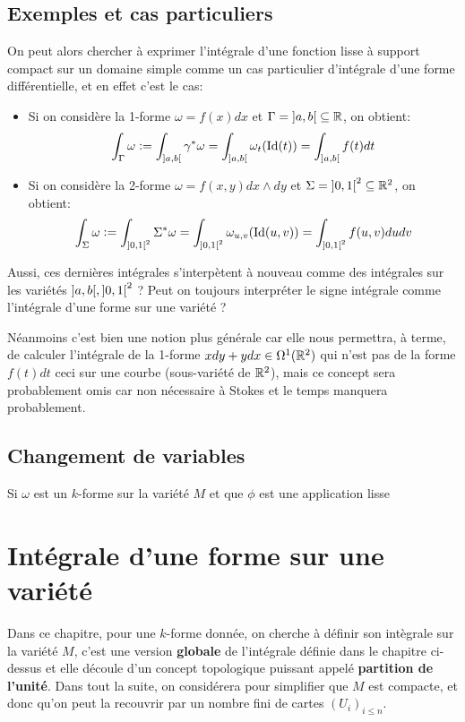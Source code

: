 \section{Exemples et cas particuliers}
On peut alors chercher à exprimer l'intégrale d'une fonction lisse à support compact sur un domaine simple comme un cas particulier d'intégrale d'une forme différentielle, et en effet c'est le cas:
\begin{itemize}
   \item Si on considère la 1-forme \( \omega = f(x)dx \) et \( \Gamma = \ioo{a}{b} \subseteq \R\), on obtient:
   \[ 
      \int_\Gamma \omega := \int_{\ioo{a}{b}}  \gamma^*\omega = \int_{\ioo{a}{b}}  \omega_{t}(\text{Id}(t)) = \int_{\ioo{a}{b}} f(t)dt
   \]
   \item Si on considère la 2-forme \( \omega = f(x, y)dx \wedge dy \) et \( \Sigma = \ioo{0}{1}^2 \subseteq \R^2 \), on obtient:
   \[ 
      \int_\Sigma \omega := \int_{\ioo{0}{1}^2}  \Sigma^*\omega = \int_{\ioo{0}{1}^2}   \omega_{u, v}(\text{Id}(u, v)) = \int_{\ioo{0}{1}^2}  f(u, v)dudv
   \]
\end{itemize}
Aussi, ces dernières intégrales s'interpètent à nouveau comme des intégrales sur les variétés \( \ioo{a}{b}, \ioo{0}{1}^2 \) ? Peut on toujours interpréter le signe intégrale comme l'intégrale d'une forme sur une variété ?\<

Néanmoins c'est bien une notion plus générale car elle nous permettra, à terme, de calculer l'intégrale de la 1-forme \( xdy + ydx \in \Omega^1(\mathbb{R}^2) \) qui n'est pas de la forme \( f(t)dt \) ceci sur une courbe (sous-variété de \( \mathbb{R}^2 \)), mais ce concept sera probablement omis car non nécessaire à Stokes et le temps manquera probablement.
\section{Changement de variables}
Si \( \omega \) est un \( k \)-forme sur la variété \( M \) et que \( \phi \) est une application lisse
\chapter{Intégrale d'une forme sur une variété}
Dans ce chapitre, pour une \( k \)-forme donnée, on cherche à définir son intègrale sur la variété \( M \), c'est une version \textbf{globale} de l'intégrale définie dans le chapitre ci-dessus et elle découle d'un concept topologique puissant appelé \textbf{partition de l'unité}. Dans tout la suite, on considérera pour simplifier que \( M \) est compacte, et donc qu'on peut la recouvrir par un nombre fini de cartes \( (U_i)_{i \leq n} \).

